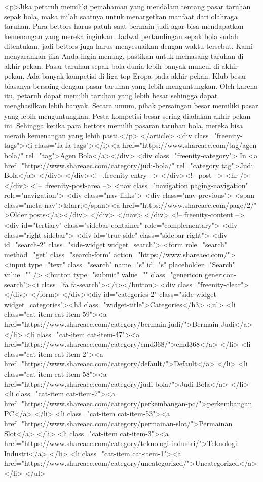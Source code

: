 {<p>Jika petaruh memiliki pemahaman yang mendalam tentang pasar taruhan sepak bola, maka inilah saatnya untuk menargetkan manfaat dari olahraga taruhan. Para bettors harus patuh saat bermain judi agar bisa mendapatkan kemenangan yang mereka inginkan. Jadwal pertandingan sepak bola sudah ditentukan, jadi bettors juga harus menyesuaikan dengan waktu tersebut. Kami menyarankan jika Anda ingin menang, pastikan untuk memasang taruhan di akhir pekan. Pasar taruhan sepak bola dunia lebih banyak muncul di akhir pekan. Ada banyak kompetisi di liga top Eropa pada akhir pekan. Klub besar biasanya bersaing dengan pasar taruhan yang lebih menguntungkan. Oleh karena itu, petaruh dapat memilih taruhan yang lebih besar sehingga dapat menghasilkan lebih banyak. Secara umum, pihak persaingan besar memiliki pasar yang lebih menguntungkan. Pesta kompetisi besar sering diadakan akhir pekan ini. Sehingga ketika para bettors memilih pasaran taruhan bola, mereka bisa meraih kemenangan yang lebih pasti.</p>
									</article>
																			<div class="freenity-tags"><i class="fa fa-tags"></i><a href="https://www.shareaec.com/tag/agen-bola/" rel="tag">Agen Bola</a></div>
																			<div class="freenity-category">
											In <a href="https://www.shareaec.com/category/judi-bola/" rel="category tag">Judi Bola</a>										</div>
																	</div><!-- .freenity-entry -->
							</div><!-- post -->
							<hr />
										</div> <!-- .freenity-post-area -->
					<nav class="navigation paging-navigation" role="navigation">
		<div class="nav-links">
							<div class="nav-previous">
					<span class="meta-nav">&larr;</span><a href="https://www.shareaec.com/page/2/" >Older posts</a></div>
								</div>
	</nav>
			</div> <!--.freenity-content -->
			<div id="tertiary" class="sidebar-container" role="complementary">
	<div class="right-sidebar">
		<div id="true-side" class="sidebar-right">
			<div id="search-2" class="side-widget widget_search">
<form role="search" method="get" class="search-form" action="https://www.shareaec.com/">
	<input type="text" class="search" name="s" id="s" placeholder="Search" value="" />
	<button type="submit" value="" class="genericon genericon-search"><i class='fa fa-search'></i></button>
	<div class="freenity-clear"></div>
</form>
</div><div id="categories-2" class="side-widget widget_categories"><h3 class="widget-title">Categories</h3>
			<ul>
					<li class="cat-item cat-item-59"><a href="https://www.shareaec.com/category/bermain-judi/">Bermain Judi</a>
</li>
	<li class="cat-item cat-item-47"><a href="https://www.shareaec.com/category/cmd368/">cmd368</a>
</li>
	<li class="cat-item cat-item-2"><a href="https://www.shareaec.com/category/default/">Default</a>
</li>
	<li class="cat-item cat-item-58"><a href="https://www.shareaec.com/category/judi-bola/">Judi Bola</a>
</li>
	<li class="cat-item cat-item-7"><a href="https://www.shareaec.com/category/perkembangan-pc/">perkembangan PC</a>
</li>
	<li class="cat-item cat-item-53"><a href="https://www.shareaec.com/category/permainan-slot/">Permainan Slot</a>
</li>
	<li class="cat-item cat-item-3"><a href="https://www.shareaec.com/category/teknologi-industri/">Teknologi Industri</a>
</li>
	<li class="cat-item cat-item-1"><a href="https://www.shareaec.com/category/uncategorized/">Uncategorized</a>
</li>
			</ul>

}
